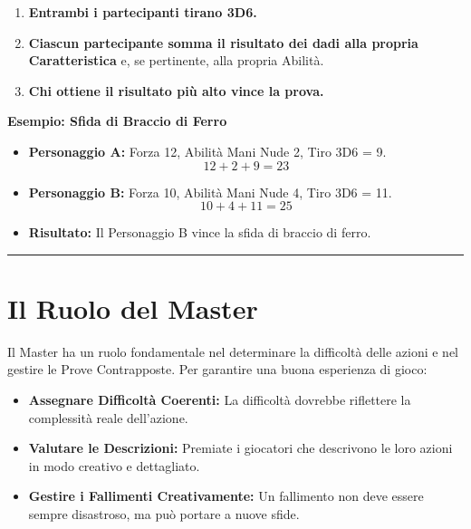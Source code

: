 \documentclass[../manuale_main.tex]{subfiles}
\begin{document}
\begin{enumerate}
    \item \textbf{Entrambi i partecipanti tirano 3D6.}
    \item \textbf{Ciascun partecipante somma il risultato dei dadi alla propria Caratteristica} e, se pertinente, alla propria Abilità.
    \item \textbf{Chi ottiene il risultato più alto vince la prova.}
\end{enumerate}

\textbf{Esempio: Sfida di Braccio di Ferro}

\begin{itemize}
    \item \textbf{Personaggio A:} Forza 12, Abilità Mani Nude 2, Tiro 3D6 = 9.
    \[
    12 + 2 + 9 = 23
    \]
    
    \item \textbf{Personaggio B:} Forza 10, Abilità Mani Nude 4, Tiro 3D6 = 11.
    \[
    10 + 4 + 11 = 25
    \]
    
    \item \textbf{Risultato:} Il Personaggio B vince la sfida di braccio di ferro.
\end{itemize}

\vspace{0.5cm}
\noindent
\begin{center}
\rule{\textwidth}{0.4pt} 
\end{center}
\vspace{0.5cm}

\section{Il Ruolo del Master}
Il Master ha un ruolo fondamentale nel determinare la difficoltà delle azioni e nel gestire le Prove Contrapposte. Per garantire una buona esperienza di gioco:

\begin{itemize}
    \item \textbf{Assegnare Difficoltà Coerenti:} La difficoltà dovrebbe riflettere la complessità reale dell'azione.
    \item \textbf{Valutare le Descrizioni:} Premiate i giocatori che descrivono le loro azioni in modo creativo e dettagliato.
    \item \textbf{Gestire i Fallimenti Creativamente:} Un fallimento non deve essere sempre disastroso, ma può portare a nuove sfide.
\end{itemize}
\end{document}
